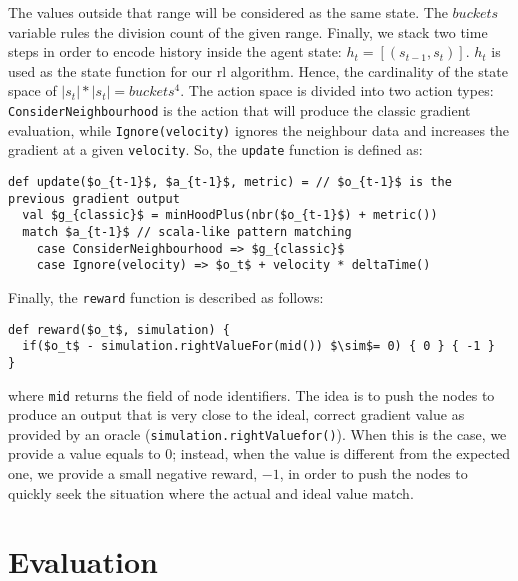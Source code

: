 %
The values outside that range will be considered as the same state.
%
The $buckets$ variable rules the division count of the given range. 
Finally, we stack two time steps in order to encode history inside the agent state:
$h_t = [(s_{t - 1}, s_t)]$. $h_t$ is used as the state function for our \ac{rl} algorithm.
Hence, the cardinality of the state space of $|s_t| * |s_t| = buckets^4$. 
%
The action space is divided into two action types: \texttt{ConsiderNeighbourhood} is the action that will produce the classic gradient evaluation, while 
 \texttt{Ignore(velocity)} ignores the neighbour data and increases the gradient at a given \texttt{velocity}. So, the \texttt{update} function is defined as:
\begin{lstlisting}[mathescape]
def update($o_{t-1}$, $a_{t-1}$, metric) = // $o_{t-1}$ is the previous gradient output
  val $g_{classic}$ = minHoodPlus(nbr($o_{t-1}$) + metric())
  match $a_{t-1}$ // scala-like pattern matching
    case ConsiderNeighbourhood => $g_{classic}$
    case Ignore(velocity) => $o_t$ + velocity * deltaTime() 
\end{lstlisting}
%
Finally, the \texttt{reward} function is described as follows: 
\begin{lstlisting}[mathescape]
def reward($o_t$, simulation) {
  if($o_t$ - simulation.rightValueFor(mid()) $\sim$= 0) { 0 } { -1 }
}
\end{lstlisting}
where \lstinline|mid| returns the field of node identifiers. 
The idea is to push the nodes to produce an output that is very close to the ideal, correct gradient value as provided by an oracle (\lstinline|simulation.rightValuefor()|).
When this is the case, we provide a value equals to $0$;
instead, when the value is different from the expected one, 
 we provide a small negative reward, $-1$, in order to push the nodes to quickly seek the situation where the actual and ideal value match.

\section{Evaluation}\label{coordination2022:s:eval}

